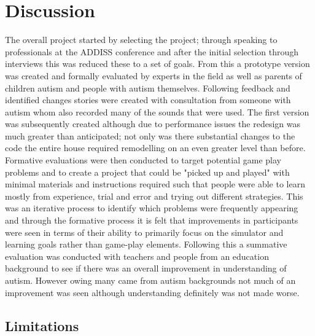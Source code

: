 \chapter{Discussion}

The overall project started by selecting the project; through speaking to professionals at the ADDISS conference and after the initial selection through interviews this was reduced these to a set of goals.  
From this a prototype version was created and formally evaluated by experts in the field as well as parents of children autism and people with autism themselves. Following feedback and identified changes stories were created with consultation from someone with autism whom also recorded many of the sounds that were used.
The first version was subsequently created although due to performance issues the redesign was much greater than anticipated; not only was there substantial changes to the code the entire house required remodelling on an even greater level than before. 
Formative evaluations were then conducted to target potential game play problems and to create a project that could be "picked up and played" with minimal materials and instructions required such that people were able to learn mostly from experience, trial and error and trying out different strategies. This was an iterative process to identify which problems were frequently appearing and through the formative process it is felt that improvements in participants were seen in terms of their ability to primarily focus on the simulator and learning goals rather than game-play elements. 
Following this a summative evaluation was conducted with teachers and people from an education background to see if there was an overall improvement in understanding of autism. However owing many came from autism backgrounds not much of an improvement was seen although understanding definitely was not made worse.

\section{Limitations}

